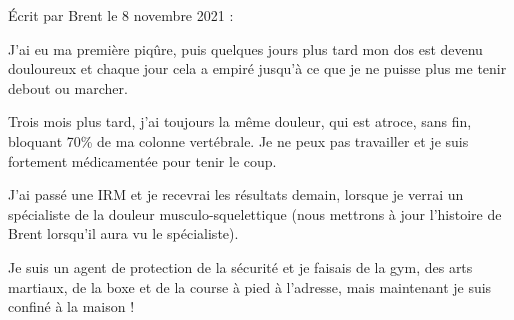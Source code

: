 Écrit par Brent le 8 novembre 2021 :

J'ai eu ma première piqûre, puis quelques jours plus tard mon dos est devenu
douloureux et chaque jour cela a empiré jusqu'à ce que je ne puisse plus me
tenir debout ou marcher.

Trois mois plus tard, j'ai toujours la même douleur, qui est atroce, sans fin,
bloquant 70\% de ma colonne vertébrale. Je ne peux pas travailler et je suis
fortement médicamentée pour tenir le coup.

J'ai passé une IRM et je recevrai les résultats demain, lorsque je verrai un
spécialiste de la douleur musculo-squelettique (nous mettrons à jour l'histoire
de Brent lorsqu'il aura vu le spécialiste).

Je suis un agent de protection de la sécurité et je faisais de la gym, des arts
martiaux, de la boxe et de la course à pied à l'adresse, mais maintenant je suis
confiné à la maison !
